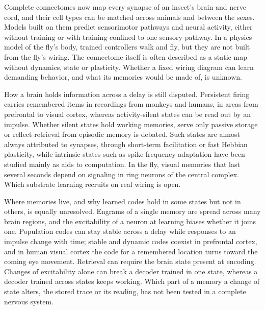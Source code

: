 
Complete connectomes now map every synapse of an insect's brain and nerve cord, and
their cell types can be matched across animals and between the sexes. Models built on them
predict sensorimotor pathways and neural activity, either without training or with training confined to one sensory
pathway. In a physics model of the fly's body, trained controllers walk and fly,
but they are not built from the fly's wiring. The connectome itself is often described as a static map
without dynamics, state or plasticity. Whether a fixed wiring diagram can learn demanding behavior, and
what its memories would be made of, is unknown.

How a brain holds information across a delay is still disputed. Persistent firing carries remembered items in recordings from
monkeys and humans, in areas from prefrontal to visual cortex, whereas
activity-silent states can be read out by an impulse. Whether silent states hold working
memories, serve only passive storage or reflect retrieval from episodic memory is
debated. Such states are almost always attributed to synapses, through
short-term facilitation or fast Hebbian plasticity, while intrinsic states
such as spike-frequency adaptation have been studied mainly as aids to computation. In the fly, visual
memories that last several seconds depend on signaling in ring neurons of the central complex.
Which substrate learning recruits on real wiring is open.

Where memories live, and why learned codes hold in some states but not in others, is equally unresolved. Engrams of a single
memory are spread across many brain regions, and the excitability of a neuron at learning biases
whether it joins one. Population codes can stay stable across a delay while responses to an
impulse change with time; stable and dynamic codes coexist in prefrontal
cortex, and in human visual cortex the code for a remembered location turns toward the coming eye
movement. Retrieval can require the brain state present at encoding. Changes of
excitability alone can break a decoder trained in one state, whereas a decoder trained across states keeps
working. Which part of a memory a change of state alters, the stored trace or its reading, has not been
tested in a complete nervous system.

